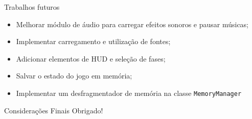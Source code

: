 \documentclass[notes, mathserif]{beamer}
\begin{document}
\begin{frame}{Trabalhos futuros}
	\begin{itemize}[<+->]
		\item Melhorar m\'odulo de \'audio para carregar efeitos sonoros e pausar m\'usicas;
		\item Implementar carregamento e utiliza\c c\~ao de fontes;
		\item Adicionar elementos de HUD e sele\c c\~ao de fases;
		\item Salvar o estado do jogo em mem\'oria;
		\item Implementar um desfragmentador de mem\'oria na classe \texttt{MemoryManager}
	\end{itemize}
\end{frame}

\begin{frame}{Considera\c c\~oes Finais}
	Obrigado!
\end{frame}
\end{document}
